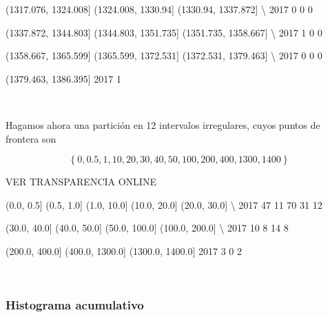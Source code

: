 \documentclass[11pt]{article}
\begin{document}
      (1317.076, 1324.008]  (1324.008, 1330.94]  (1330.94, 1337.872]  \textbackslash{}
2017                     0                    0                    0   

      (1337.872, 1344.803]  (1344.803, 1351.735]  (1351.735, 1358.667]  \textbackslash{}
2017                     1                     0                     0   

      (1358.667, 1365.599]  (1365.599, 1372.531]  (1372.531, 1379.463]  \textbackslash{}
2017                     0                     0                     0   

      (1379.463, 1386.395]  
2017                     1  
            
    \begin{center}
    \end{center}
    { \hspace*{\fill} \\}
    
    Hagamos ahora una partición en 12 intervalos irregulares, cuyos puntos
de frontera son


\[\left\{0, 0.5, 1, 10, 20, 30, 40, 50, 100, 200, 400, 1300, 1400\right\}\]


VER TRANSPARENCIA ONLINE

      (0.0, 0.5]  (0.5, 1.0]  (1.0, 10.0]  (10.0, 20.0]  (20.0, 30.0]  \textbackslash{}
2017          47          11           70            31            12   

      (30.0, 40.0]  (40.0, 50.0]  (50.0, 100.0]  (100.0, 200.0]  \textbackslash{}
2017            10             8             14               8   

      (200.0, 400.0]  (400.0, 1300.0]  (1300.0, 1400.0]  
2017               3                0                 2  
            
    \begin{center}
    \end{center}
    { \hspace*{\fill} \\}
    
    \subsubsection*{Histograma acumulativo}\label{histograma-acumulativo}
\end{document}
